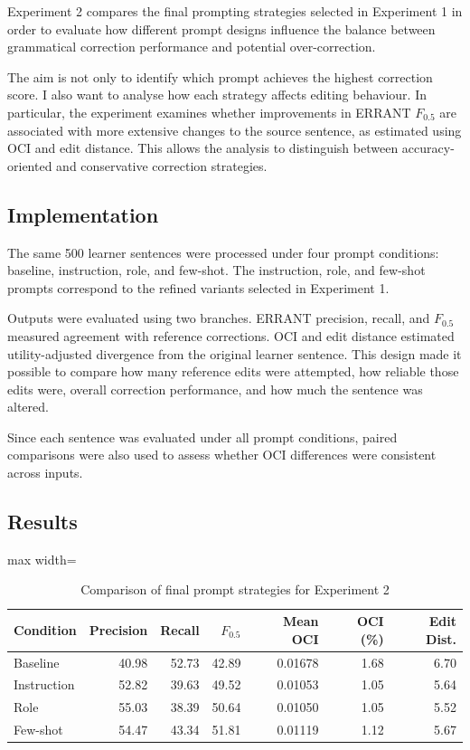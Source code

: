 Experiment 2 compares the final prompting strategies selected in Experiment 1 in order to evaluate how different prompt designs influence the balance between grammatical correction performance and potential over-correction.

The aim is not only to identify which prompt achieves the highest correction score. I also want to analyse how each strategy affects editing behaviour. In particular, the experiment examines whether improvements in ERRANT $F_{0.5}$ are associated with more extensive changes to the source sentence, as estimated using OCI and edit distance. This allows the analysis to distinguish between accuracy-oriented and conservative correction strategies.

\subsection{Implementation}

The same 500 learner sentences were processed under four prompt conditions: baseline, instruction, role, and few-shot. The instruction, role, and few-shot prompts correspond to the refined variants selected in Experiment 1.

Outputs were evaluated using two branches. ERRANT precision, recall, and $F_{0.5}$ measured agreement with reference corrections. OCI and edit distance estimated utility-adjusted divergence from the original learner sentence. This design made it possible to compare how many reference edits were attempted, how reliable those edits were, overall correction performance, and how much the sentence was altered.

Since each sentence was evaluated under all prompt conditions, paired comparisons were also used to assess whether OCI differences were consistent across inputs.

\subsection{Results}

\begin{table}[htbp]
    \centering
    \caption{Comparison of final prompt strategies for Experiment 2}
    \label{tab:exp2_strategy_comparison}
    \renewcommand{\arraystretch}{1.15}
    \begin{adjustbox}{max width=\textwidth}
    \begin{tabular}{lrrrrrr}
        \toprule
        \textbf{Condition} & \textbf{Precision} & \textbf{Recall} & \textbf{$F_{0.5}$} & \textbf{Mean OCI} & \textbf{OCI (\%)} & \textbf{Edit Dist.} \\
        \midrule
        Baseline    & 40.98 & 52.73 & 42.89 & 0.01678 & 1.68 & 6.70 \\
        Instruction & 52.82 & 39.63 & 49.52 & 0.01053 & 1.05 & 5.64 \\
        Role        & 55.03 & 38.39 & 50.64 & 0.01050 & 1.05 & 5.52 \\
        Few-shot    & 54.47 & 43.34 & 51.81 & 0.01119 & 1.12 & 5.67 \\
        \bottomrule
    \end{tabular}
    \end{adjustbox}
\end{table}


